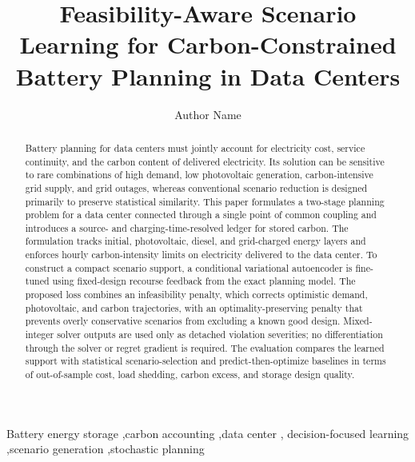\documentclass[times]{elsarticle}
\begin{document}
\begin{frontmatter}

\title{Feasibility-Aware Scenario Learning for Carbon-Constrained Battery Planning in Data Centers}

\author[seuaddress]{Author Name}
\address[seuaddress]{School of Electrical Engineering, Southeast University,
Nanjing, China}

\begin{abstract}
Battery planning for data centers must jointly account for electricity cost,
service continuity, and the carbon content of delivered electricity. Its
solution can be sensitive to rare combinations of high demand, low photovoltaic
generation, carbon-intensive grid supply, and grid outages, whereas conventional
scenario reduction is designed primarily to preserve statistical similarity.
This paper formulates a two-stage planning problem for a data center connected
through a single point of common coupling and introduces a source- and
charging-time-resolved ledger for stored carbon. The formulation tracks initial,
photovoltaic, diesel, and grid-charged energy layers and enforces hourly
carbon-intensity limits on electricity delivered to the data center. To
construct a compact scenario support, a conditional variational autoencoder is
fine-tuned using fixed-design recourse feedback from the exact planning model.
The proposed loss combines an infeasibility penalty, which corrects optimistic
demand, photovoltaic, and carbon trajectories, with an optimality-preserving
penalty that prevents overly conservative scenarios from excluding a known good
design. Mixed-integer solver outputs are used only as detached violation
severities; no differentiation through the solver or regret gradient is
required. The evaluation compares the learned support with statistical
scenario-selection and predict-then-optimize baselines in terms of
out-of-sample cost, load shedding, carbon excess, and storage design quality.
\end{abstract}

\begin{keyword}
Battery energy storage \sep carbon accounting \sep data center \sep
decision-focused learning \sep scenario generation \sep stochastic planning
\end{keyword}

\end{frontmatter}
\end{document}

